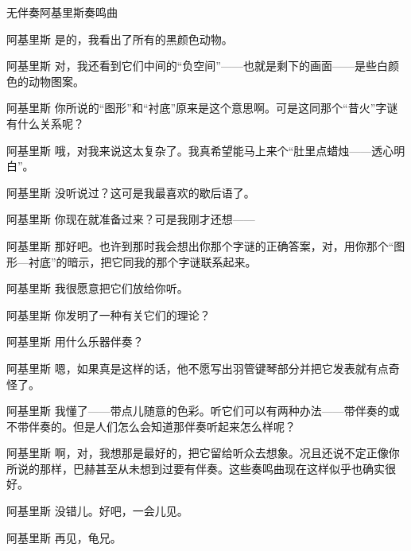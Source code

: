 \begin{dialog}{无伴奏阿基里斯奏鸣曲}
\begin{dialogue}
\item[阿基里斯]是的，我看出了所有的黑颜色动物。

\item[阿基里斯]对，我还看到它们中间的“负空间”——也就是剩下的画面——是些白颜色的动物图案。

\item[阿基里斯]你所说的“图形”和“衬底”原来是这个意思啊。可是这同那个“昔火”字谜有什么关系呢？

\item[阿基里斯]哦，对我来说这太复杂了。我真希望能马上来个“肚里点蜡烛——透心明白”。

\item[阿基里斯]没听说过？这可是我最喜欢的歇后语了。

\item[阿基里斯]你现在就准备过来？可是我刚才还想——

\item[阿基里斯]那好吧。也许到那时我会想出你那个字谜的正确答案，对，用你那个“图形—衬底”的暗示，把它同我的那个字谜联系起来。

\item[阿基里斯]我很愿意把它们放给你听。

\item[阿基里斯]你发明了一种有关它们的理论？

\item[阿基里斯]用什么乐器伴奏？

\item[阿基里斯]嗯，如果真是这样的话，他不愿写出羽管键琴部分并把它发表就有点奇怪了。

\item[阿基里斯]我懂了——带点儿随意的色彩。听它们可以有两种办法——带伴奏的或不带伴奏的。但是人们怎么会知道那伴奏听起来怎么样呢？

\item[阿基里斯]啊，对，我想那是最好的，把它留给听众去想象。况且还说不定正像你所说的那样，巴赫甚至从未想到过要有伴奏。这些奏鸣曲现在这样似乎也确实很好。

\item[阿基里斯]没错儿。好吧，一会儿见。

\item[阿基里斯]再见，龟兄。

\end{dialogue}

\end{dialog}
